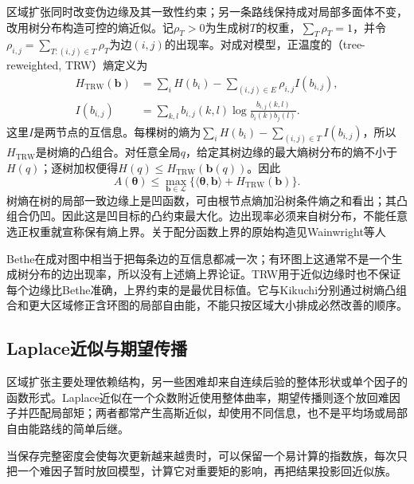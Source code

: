 区域扩张同时改变伪边缘及其一致性约束；另一条路线保持成对局部多面体不变，改用树分布构造可控的熵近似。记$\rho_T>0$为生成树$T$的权重，$\sum_T\rho_T=1$，并令$\rho_{i,j}=\sum_{T:(i,j)\in T}\rho_T$为边$(i,j)$的出现率。对成对模型，正温度的（tree-reweighted, TRW）熵定义为
\begin{equation}
  \begin{aligned}
    H_{\mathrm{TRW}}(\bm b)
      &=\sum_iH(b_i)-\sum_{(i,j)\in E}\rho_{i,j}I(b_{i,j}),\\
    I(b_{i,j})
      &=\sum_{k,l}b_{i,j}(k,l)
            \log\frac{b_{i,j}(k,l)}{b_i(k)b_j(l)}.
  \end{aligned}
  \label{eq:pgm-variational-trw-entropy}
\end{equation}
这里$I$是两节点的互信息。每棵树的熵为$\sum_iH(b_i)-\sum_{(i,j)\in T}I(b_{i,j})$，所以$H_{\mathrm{TRW}}$是树熵的凸组合。对任意全局$q$，给定其树边缘的最大熵树分布的熵不小于$H(q)$；逐树加权便得$H(q)\leq H_{\mathrm{TRW}}(\bm b(q))$。因此
\begin{equation}
  A(\bm{\theta})\leq
    \max_{\bm b\in\mathcal L}
       \{\langle\bm{\theta},\bm b\rangle+H_{\mathrm{TRW}}(\bm b)\}.
  \label{eq:pgm-variational-trw-partition}
\end{equation}
树熵在树的局部一致边缘上是凹函数，可由根节点熵加沿树条件熵之和看出；其凸组合仍凹。因此这是凹目标的凸约束最大化。边出现率必须来自树分布，不能任意选正权重就宣称保有熵上界。关于配分函数上界的原始构造见Wainwright等人

Bethe在成对图中相当于把每条边的互信息都减一次；有环图上这通常不是一个生成树分布的边出现率，所以没有上述熵上界论证。TRW用于近似边缘时也不保证每个边缘比Bethe准确，上界约束的是最优目标值。它与Kikuchi分别通过树熵凸组合和更大区域修正含环图的局部自由能，不能只按区域大小排成必然改善的顺序。

\subsection{Laplace近似与期望传播}
\label{sec:pgm-variational-laplace-ep}
\label{sec:pgm-variational-ep}

区域扩张主要处理依赖结构，另一些困难却来自连续后验的整体形状或单个因子的函数形式。Laplace近似在一个众数附近使用整体曲率，期望传播则逐个放回难因子并匹配局部矩；两者都常产生高斯近似，却使用不同信息，也不是平均场或局部自由能路线的简单后继。

当保存完整密度会使每次更新越来越贵时，可以保留一个易计算的指数族，每次只把一个难因子暂时放回模型，计算它对重要矩的影响，再把结果投影回近似族。

